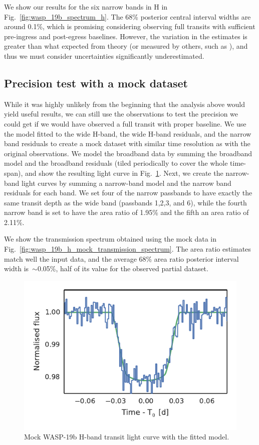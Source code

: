 \documentclass[useAMS,usenatbib]{mn2e}
\begin{document}
We show our results for the six narrow bands in H in Fig.~\ref{fig:wasp_19b_spectrum_h}. The 68\% posterior central 
interval widths are around 0.1\%, which is promising considering observing full transits with sufficient pre-ingress 
and post-egress baselines. However, the variation in the estimates is greater than what expected from theory (or 
measured by others, such as \citealt{Bean2013}), and thus we must consider uncertainties significantly underestimated.

\subsection{Precision test with a mock dataset}
\label{sec:wasp_19b:precision_test}

While it was highly unlikely from the beginning that the analysis above would yield useful results, we can
still use the observations to test the precision we could get if we would have observed a full transit with proper
baseline. We use the model fitted to the wide H-band, the wide H-band residuals, and the narrow band residuals to create
a mock dataset with similar time resolution as with the original observations. We model the broadband data by summing
the broadband model and the broadband residuals (tiled periodically to cover the whole time-span), and show the
resulting light curve in Fig.~\ref{fig:wasp_19b_mock_lc_h}. Next, we create the narrow-band light curves by summing a
narrow-band model and the narrow band residuals for each band. We set four of the narrow passbands to have exactly the
same transit depth as the wide band (passbands 1,2,3, and 6), while the fourth narrow band is set to have the area ratio
of 1.95\% and the fifth an area ratio of 2.11\%. 

We show the transmission spectrum obtained using the mock data in Fig.~\ref{fig:wasp_19b_h_mock_transmission_spectrum}. 
The area ratio estimates match well the input data, and the average 68\% area ratio posterior interval width 
is~$\sim$0.05\%, half of its value for the observed partial dataset.

\begin{figure}
 \centering
 \includegraphics[width=\columnwidth]{wasp_19_h_fake_lc.pdf}
 \caption{Mock WASP-19b H-band transit light curve with the fitted model.}
 \label{fig:wasp_19b_mock_lc_h}
\end{figure}
\end{document}

